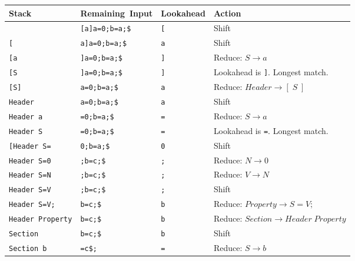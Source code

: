 \begin{figure}[H]
    \begin{center}
        \begin{tabular}{| m{3.5cm} | m{3cm} | m{2cm} | m{5cm} |}
            \hline
            Stack & \mbox{Remaining Input} & Lookahead & Action\\
            \hline
            & \verb|[a]a=0;b=a;$| & \verb|[| & Shift\\
            \hline
            \verb|[| & \verb|a]a=0;b=a;$| & \verb|a| & Shift\\
            \hline
            \verb|[a| & \verb|]a=0;b=a;$| & \verb|]| & Reduce: $S \rightarrow a$\\
            \hline
            \verb|[S| & \verb|]a=0;b=a;$| & \verb|]| & Lookahead is \verb|]|. Longest match.\\
            \hline
            \verb|[S]| & \verb|a=0;b=a;$| & \verb|a| & Reduce: $Header \rightarrow [\;S\;]$\\
            \hline
            \verb|Header| & \verb|a=0;b=a;$| & \verb|a| & Shift\\
            \hline
            \verb|Header a| & \verb|=0;b=a;$| & \verb|=| & Reduce: $S \rightarrow a$\\
            \hline
            \verb|Header S| & \verb|=0;b=a;$| & \verb|=| & Lookahead is \verb|=|. Longest match.\\
            \hline
            \verb|[Header S=| & \verb|0;b=a;$| & \verb|0| & Shift\\
            \hline
            \verb|Header S=0| & \verb|;b=c;$| & \verb|;| & Reduce: $N \rightarrow 0$\\
            \hline
            \verb|Header S=N| & \verb|;b=c;$| & \verb|;| & Reduce: $V \rightarrow N$\\
            \hline
            \verb|Header S=V| & \verb|;b=c;$| & \verb|;| & Shift\\
            \hline
            \verb|Header S=V;| & \verb|b=c;$| & \verb|b| & Reduce: $Property \rightarrow S = V;$\\
            \hline
            \verb|Header Property| & \verb|b=c;$| & \verb|b| & Reduce: $Section \rightarrow Header\;Property$\\
            \hline
            \verb|Section| & \verb|b=c;$| & \verb|b| & Shift\\
            \hline
            \verb|Section b| & \verb|=c$;| & \verb|=| & Reduce: $S \rightarrow b$\\

\end{tabular}
\end{center}
\end{figure}
